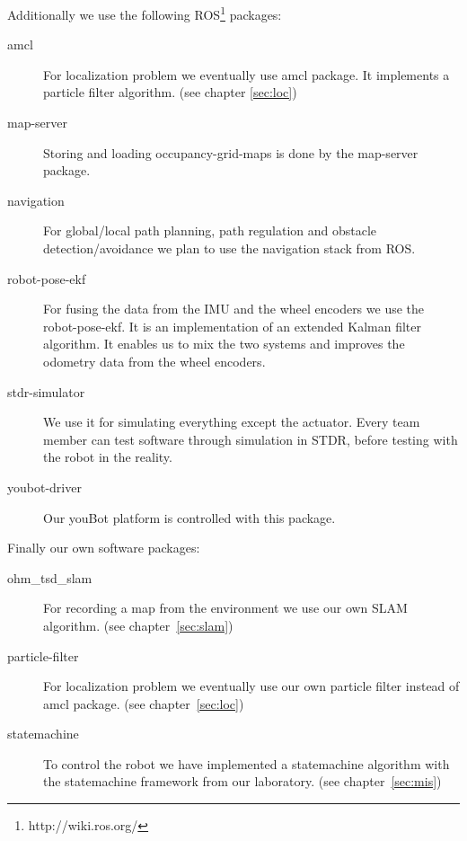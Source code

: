 \noindent Additionally we use the following ROS\footnote{http://wiki.ros.org/} packages:

\begin{description}
	\item [amcl] For localization problem we eventually use amcl package. It implements a particle filter algorithm. (see chapter \ref{sec:loc})
	\item [map-server] Storing and loading occupancy-grid-maps is done by the map-server package.
	\item [navigation] For global/local path planning, path regulation and obstacle detection/avoidance we plan to use the navigation stack from ROS.
	\item [robot-pose-ekf] For fusing the data from the IMU and the wheel encoders we use the robot-pose-ekf. It is an implementation of an extended Kalman filter algorithm. It enables us to mix the two systems and improves the odometry data from the wheel encoders.
	\item [stdr-simulator] We use it for simulating everything except the actuator. Every team member can test software through simulation in STDR, before testing with the robot in the reality.
	\item [youbot-driver] Our youBot platform is controlled with this package.
\end{description}

\noindent Finally our own software packages:

\begin{description}
	\item [ohm\_tsd\_slam] For recording a map from the environment we use our own SLAM algorithm. (see chapter~\ref{sec:slam})
	\item [particle-filter] For localization problem we eventually use our own particle filter instead of amcl package. (see chapter~\ref{sec:loc})
	\item [statemachine] To control the robot we have implemented a statemachine algorithm with the statemachine framework from our laboratory. (see chapter~\ref{sec:mis})
\end{description}

